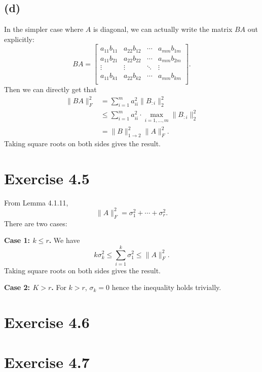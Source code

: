 \subsection*{(d)}
In the simpler case where $A$ is diagonal, we can actually write the matrix $BA$ out explicitly: 
\[ BA = \begin{bmatrix}
a_{11}b_{11} & a_{22}b_{12} & \cdots & a_{mm}b_{1m} \\
a_{11}b_{21} & a_{22}b_{22} & \cdots & a_{mm}b_{2m} \\
\vdots & \vdots & \ddots & \vdots \\
a_{11}b_{k1} & a_{22}b_{k2} & \cdots & a_{mm}b_{km} \\
\end{bmatrix}. \]
Then we can directly get that 
\begin{align*}
	\lVert BA \rVert_{F}^2 
	&= \sum_{i = 1}^{m} a_{ii}^2 \lVert B_{:i} \rVert_{2}^2 \\
	&\leq \sum_{i = 1}^{m}a_{ii}^2 \cdot \max_{i = 1, \dots, m} \lVert B_{:i} \rVert_{2}^2 \\
	&= \lVert B \rVert_{1 \to 2}^2 \lVert A \rVert_{F}^2.
\end{align*}
Taking square roots on both sides gives the result.


\newpage
\section*{Exercise 4.5}
From Lemma 4.1.11, 
\[ \lVert A \rVert_{F}^2 = \sigma_1^2 + \cdots + \sigma_r^2. \]
There are two cases: 

\textbf{Case 1: $k \leq r$.} We have 
\[ k \sigma_k^2 \leq \sum_{i = 1}^{k} \sigma_1^2 \leq \lVert A \rVert_{F}^2. \]
Taking square roots on both sides gives the result.

\textbf{Case 2: $K > r$.} For $k > r$, $\sigma_k = 0$ hence the inequality holds trivially.


\newpage
\section*{Exercise 4.6}


\newpage
\section*{Exercise 4.7}

